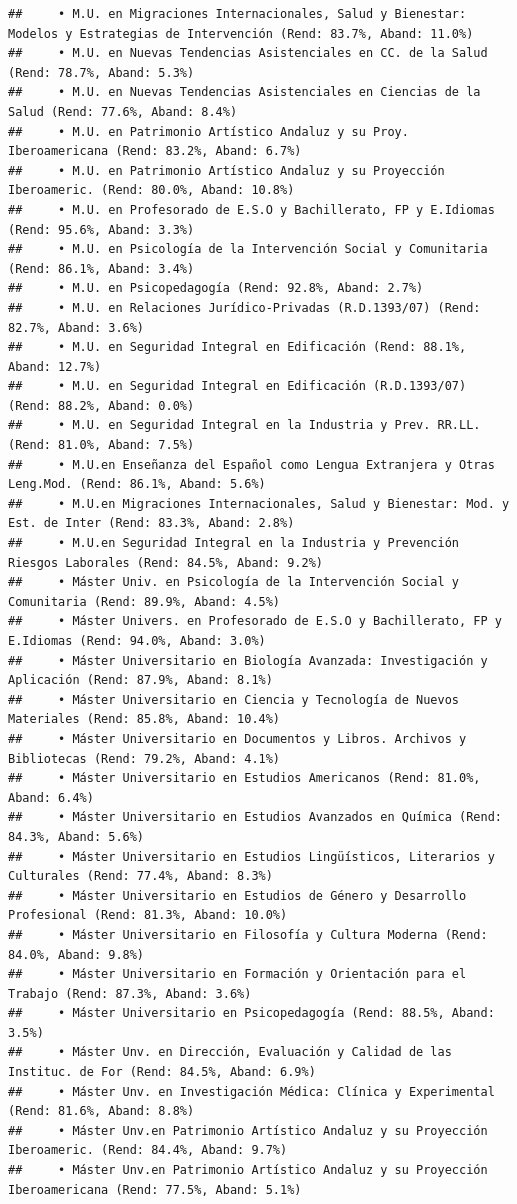 \documentclass[
]{article}
\begin{document}
\begin{verbatim}
##     • M.U. en Migraciones Internacionales, Salud y Bienestar: Modelos y Estrategias de Intervención (Rend: 83.7%, Aband: 11.0%)
##     • M.U. en Nuevas Tendencias Asistenciales en CC. de la Salud (Rend: 78.7%, Aband: 5.3%)
##     • M.U. en Nuevas Tendencias Asistenciales en Ciencias de la Salud (Rend: 77.6%, Aband: 8.4%)
##     • M.U. en Patrimonio Artístico Andaluz y su Proy. Iberoamericana (Rend: 83.2%, Aband: 6.7%)
##     • M.U. en Patrimonio Artístico Andaluz y su Proyección Iberoameric. (Rend: 80.0%, Aband: 10.8%)
##     • M.U. en Profesorado de E.S.O y Bachillerato, FP y E.Idiomas (Rend: 95.6%, Aband: 3.3%)
##     • M.U. en Psicología de la Intervención Social y Comunitaria (Rend: 86.1%, Aband: 3.4%)
##     • M.U. en Psicopedagogía (Rend: 92.8%, Aband: 2.7%)
##     • M.U. en Relaciones Jurídico-Privadas (R.D.1393/07) (Rend: 82.7%, Aband: 3.6%)
##     • M.U. en Seguridad Integral en Edificación (Rend: 88.1%, Aband: 12.7%)
##     • M.U. en Seguridad Integral en Edificación (R.D.1393/07) (Rend: 88.2%, Aband: 0.0%)
##     • M.U. en Seguridad Integral en la Industria y Prev. RR.LL. (Rend: 81.0%, Aband: 7.5%)
##     • M.U.en Enseñanza del Español como Lengua Extranjera y Otras Leng.Mod. (Rend: 86.1%, Aband: 5.6%)
##     • M.U.en Migraciones Internacionales, Salud y Bienestar: Mod. y Est. de Inter (Rend: 83.3%, Aband: 2.8%)
##     • M.U.en Seguridad Integral en la Industria y Prevención Riesgos Laborales (Rend: 84.5%, Aband: 9.2%)
##     • Máster Univ. en Psicología de la Intervención Social y Comunitaria (Rend: 89.9%, Aband: 4.5%)
##     • Máster Univers. en Profesorado de E.S.O y Bachillerato, FP y E.Idiomas (Rend: 94.0%, Aband: 3.0%)
##     • Máster Universitario en Biología Avanzada: Investigación y Aplicación (Rend: 87.9%, Aband: 8.1%)
##     • Máster Universitario en Ciencia y Tecnología de Nuevos Materiales (Rend: 85.8%, Aband: 10.4%)
##     • Máster Universitario en Documentos y Libros. Archivos y Bibliotecas (Rend: 79.2%, Aband: 4.1%)
##     • Máster Universitario en Estudios Americanos (Rend: 81.0%, Aband: 6.4%)
##     • Máster Universitario en Estudios Avanzados en Química (Rend: 84.3%, Aband: 5.6%)
##     • Máster Universitario en Estudios Lingüísticos, Literarios y Culturales (Rend: 77.4%, Aband: 8.3%)
##     • Máster Universitario en Estudios de Género y Desarrollo Profesional (Rend: 81.3%, Aband: 10.0%)
##     • Máster Universitario en Filosofía y Cultura Moderna (Rend: 84.0%, Aband: 9.8%)
##     • Máster Universitario en Formación y Orientación para el Trabajo (Rend: 87.3%, Aband: 3.6%)
##     • Máster Universitario en Psicopedagogía (Rend: 88.5%, Aband: 3.5%)
##     • Máster Unv. en Dirección, Evaluación y Calidad de las Instituc. de For (Rend: 84.5%, Aband: 6.9%)
##     • Máster Unv. en Investigación Médica: Clínica y Experimental (Rend: 81.6%, Aband: 8.8%)
##     • Máster Unv.en Patrimonio Artístico Andaluz y su Proyección Iberoameric. (Rend: 84.4%, Aband: 9.7%)
##     • Máster Unv.en Patrimonio Artístico Andaluz y su Proyección Iberoamericana (Rend: 77.5%, Aband: 5.1%)
\end{verbatim}
\end{document}

